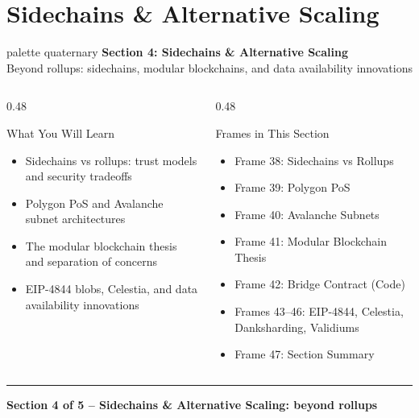 \documentclass[8pt,aspectratio=169]{beamer}
\newcommand{\bottomnote}[1]{\vfill\vspace{-2mm}\textcolor{mllavender2}{\rule{\textwidth}{0.4pt}}\vspace{1mm}\footnotesize\textbf{#1}}
\begin{document}
\section{Sidechains \& Alternative Scaling}

\begin{frame}{}
\begin{beamercolorbox}[sep=12pt,center,rounded=true,shadow=true]{palette quaternary}
{\Large\bfseries Section 4: Sidechains \& Alternative Scaling}\\[6pt]
{\normalsize Beyond rollups: sidechains, modular blockchains, and data availability innovations}
\end{beamercolorbox}
\vspace{6mm}
\begin{columns}[T]
\begin{column}{0.48\textwidth}
\begin{block}{What You Will Learn}
\begin{itemize}\setlength\itemsep{3pt}
  \item[\small$\checkmark$] \small Sidechains vs rollups: trust models and security tradeoffs
  \item[\small$\checkmark$] \small Polygon PoS and Avalanche subnet architectures
  \item[\small$\checkmark$] \small The modular blockchain thesis and separation of concerns
  \item[\small$\checkmark$] \small EIP-4844 blobs, Celestia, and data availability innovations
\end{itemize}
\end{block}
\end{column}
\begin{column}{0.48\textwidth}
\begin{block}{Frames in This Section}
\begin{itemize}\setlength\itemsep{3pt}
  \item[\small$\bullet$] \small Frame 38: Sidechains vs Rollups
  \item[\small$\bullet$] \small Frame 39: Polygon PoS
  \item[\small$\bullet$] \small Frame 40: Avalanche Subnets
  \item[\small$\bullet$] \small Frame 41: Modular Blockchain Thesis
  \item[\small$\bullet$] \small Frame 42: Bridge Contract (Code)
  \item[\small$\bullet$] \small Frames 43--46: EIP-4844, Celestia, Danksharding, Validiums
  \item[\small$\bullet$] \small Frame 47: Section Summary
\end{itemize}
\end{block}
\end{column}
\end{columns}
\bottomnote{Section 4 of 5 -- Sidechains \& Alternative Scaling: beyond rollups}
\end{frame}
\end{document}
